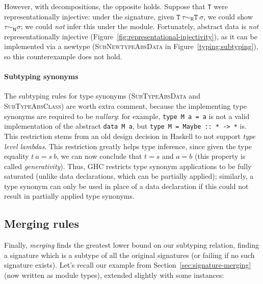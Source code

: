 However, with decompositions, the opposite holds. Suppose that \verb|T|
were representationally injective: under the signature, given
$\texttt{T}~\tau \sim_\textsf{R} \texttt{T}~\sigma$, we could
show $\tau \sim_\textsf{N} \sigma$; we could \emph{not} infer
this under the module.
Fortunately, abstract data is \emph{not}
representationally injective (Figure~\ref{fig:representational-injectivity}), as it can be implemented via
a newtype (\textsc{SubNewtypeAbsData} in Figure~\ref{typing:subtyping}),
so this counterexample does not hold.

\paragraph{Subtyping synonyms}
The subtyping rules for type synonyms (\textsc{SubTypeAbsData} and
\textsc{SubTypeAbsClass}) are worth extra comment, because the implementing
type synonyms are required to be \emph{nullary}: for example, \verb|type M a = a|
is not a valid implementation of the abstract \verb|data M a|,
but \verb|type M = Maybe :: * -> *| is.  This restriction
stems from an old design decision in Haskell to not support \emph{type level
lambdas}.  This restriction greatly helps type inference, since given the
type equality $t~a = s~b$, we can now conclude that $t = s$ and $a = b$
(this property is called \emph{generativity}).  Thus, GHC restricts type
synonym applications to be fully saturated (unlike data declarations, which can
be partially applied); similarly, a type synonym can only be used in place
of a data declaration if this could not result in partially applied type
synonyms.

\subsection{Merging rules}
\label{sec:typing/merging}



Finally, \emph{merging} finds the greatest lower bound on our subtyping relation,
finding a signature which is a subtype of all the original signatures (or failing
if no such signature exists).  Let's recall our example from Section~\ref{sec:signature-merging}
(now written as module types), extended slightly with some instances:

